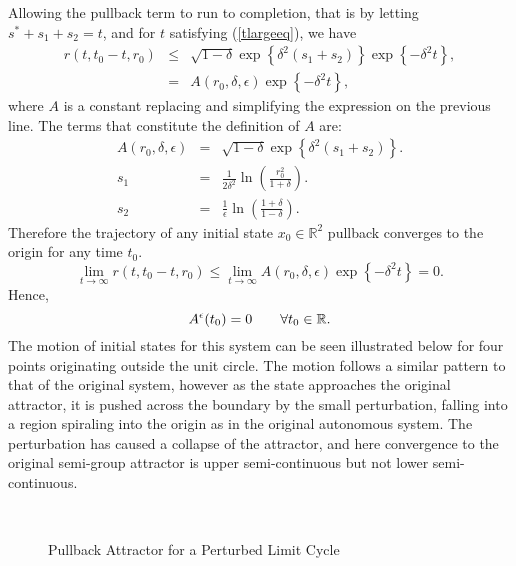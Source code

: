 Allowing the pullback term to run to completion, that is by letting
$s^*+s_1+s_2=t$, and for $t$ satisfying (\ref{tlargeeq}), we have
\begin{eqnarray*}
  r(t,t_0-t,r_0) & \leq & \sqrt{1-\delta} \exp\left\{\delta^2(s_1+s_2)
        \right\} \exp\left\{- \delta^{2}t \right\}, \\
  & = & A(r_0,\delta,\epsilon) \exp\left\{- \delta^{2}t \right\},
\end{eqnarray*}
where $A$ is a constant replacing and simplifying the expression
on the previous line. The terms that constitute the definition of $A$ are:
\begin{eqnarray*}
  A(r_0,\delta,\epsilon) & = & \sqrt{1-\delta} \exp\left\{\delta^2(s_1+s_2)
                \right\}. \\
  s_1 & = & \frac{1}{2 \delta^{2}} \ln \left( \frac{r_{0}^2}{1+\delta}
                \right). \\
  s_2 & = & \frac{1}{\epsilon} \ln(\frac{1+\delta}{1-\delta}).
\end{eqnarray*}
Therefore the trajectory of any initial state $x_0 \in
\mathbb{R}^2$ pullback converges to the origin for any
time $t_0$.
\[  \lim_{t\rightarrow\infty}r(t,t_0-t,r_0) \leq \lim_{t
        \rightarrow \infty} A(r_0,\delta,\epsilon) \exp\left\{- \delta^{2}t
        \right\} = 0. \]
Hence,
\[ A^{\epsilon}(t_0) = 0 \qquad \forall t_0 \in \mathbb{R}. \]
The motion of initial states for this system can be seen
illustrated below for four points originating outside the unit
circle. The motion follows a similar pattern to that of the
original system, however as the state approaches the original
attractor, it is pushed across the boundary by the small
perturbation, falling into a region spiraling into the origin as
in the original autonomous system. The perturbation has caused a
collapse of the attractor, and here convergence to the original
semi-group attractor is upper semi-continuous but not lower
semi-continuous.

\begin{figure}[htb]
  \begin{center}
  \leavevmode
  \hbox{
  \epsfxsize=9.5cm
    }%
  \protect\caption{Pullback Attractor for a Perturbed Limit Cycle}
        \protect\label{nlcpic}
  \end{center}
\end{figure}

\endinput
